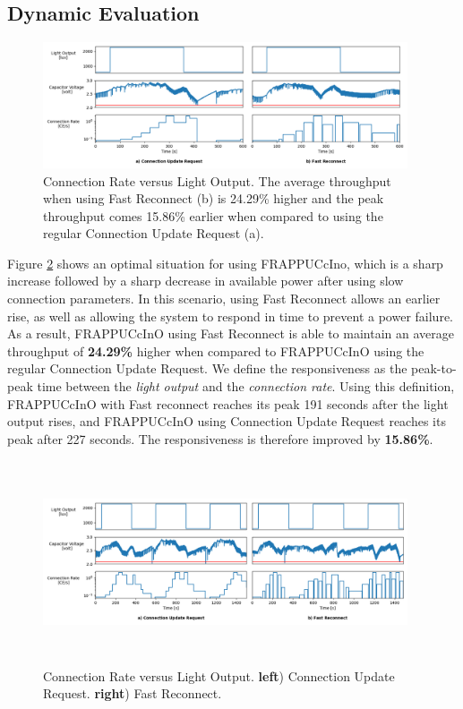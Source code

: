 \subsection{Dynamic Evaluation}
\label{sec:dynamic_evaluation}
\begin{figure}[]
    \centering
    \includegraphics[width=0.96\textwidth,keepaspectratio=true]{plots/dynamic_short_both.png}
    \caption{
        Connection Rate versus Light Output. The average throughput when using Fast Reconnect (b) is 24.29\% higher and the peak throughput comes 15.86\% earlier when compared to using the regular Connection Update Request (a).
    }
    \label{fig:dynamic_short_both}
\end{figure}

Figure \ref{fig:dynamic_long_both} shows an optimal situation for using FRAPPUCcIno, which is a sharp increase followed by a sharp decrease in available power after using slow connection parameters. In this scenario, using Fast Reconnect allows an earlier rise, as well as allowing the system to respond in time to prevent a power failure. As a result, FRAPPUCcInO using Fast Reconnect is able to maintain an average throughput of \textbf{24.29\%} higher when compared to FRAPPUCcInO using the regular Connection Update Request. We define the responsiveness as the peak-to-peak time between the \textit{light output} and the \textit{connection rate}. Using this definition, FRAPPUCcInO with Fast reconnect reaches its peak 191 seconds after the light output rises, and FRAPPUCcInO using Connection Update Request reaches its peak after 227 seconds. The responsiveness is therefore improved by \textbf{15.86\%}.


\begin{figure}[]
    \centering
    \includegraphics[width=0.96\textwidth,height=6cm,keepaspectratio=true]{plots/dynamic_long_both.png}
    \caption{
        Connection Rate versus Light Output. \textbf{left}) Connection Update Request. \textbf{right}) Fast Reconnect.
    }
    \label{fig:dynamic_long_both}
\end{figure}

